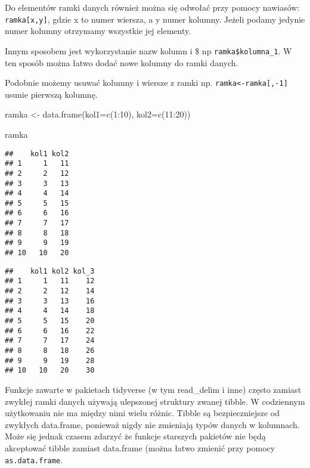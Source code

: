 \documentclass[
]{book}
\newenvironment{Shaded}{\begin{snugshade}}{\end{snugshade}}
\newcommand{\AttributeTok}[1]{\textcolor[rgb]{0.77,0.63,0.00}{#1}}
\newcommand{\DecValTok}[1]{\textcolor[rgb]{0.00,0.00,0.81}{#1}}
\newcommand{\FunctionTok}[1]{\textcolor[rgb]{0.00,0.00,0.00}{#1}}
\newcommand{\NormalTok}[1]{#1}
\newcommand{\OtherTok}[1]{\textcolor[rgb]{0.56,0.35,0.01}{#1}}
\newcommand{\SpecialCharTok}[1]{\textcolor[rgb]{0.00,0.00,0.00}{#1}}
\begin{document}
Do elementów ramki danych również można się odwołać przy pomocy nawiasów: \texttt{ramka{[}x,y{]}}, gdzie x to numer wiersza, a y numer kolumny. Jeżeli podamy jedynie numer kolumny otrzymamy wszystkie jej elementy.

Innym sposobem jest wykorzystanie nazw kolumn i \$ np \texttt{ramka\$kolumna\_1}. W ten sposób można łatwo dodać nowe kolumny do ramki danych.

Podobnie możemy usuwać kolumny i wiersze z ramki np. \texttt{ramka\textless{}-ramka{[},-1{]}} usunie pierwszą kolumnę.

\begin{Shaded}
\begin{Highlighting}[]
\NormalTok{ramka }\OtherTok{\textless{}{-}} \FunctionTok{data.frame}\NormalTok{(}\AttributeTok{kol1=}\FunctionTok{c}\NormalTok{(}\DecValTok{1}\SpecialCharTok{:}\DecValTok{10}\NormalTok{), }\AttributeTok{kol2=}\FunctionTok{c}\NormalTok{(}\DecValTok{11}\SpecialCharTok{:}\DecValTok{20}\NormalTok{))}

\NormalTok{ramka}
\end{Highlighting}
\end{Shaded}

\begin{verbatim}
##    kol1 kol2
## 1     1   11
## 2     2   12
## 3     3   13
## 4     4   14
## 5     5   15
## 6     6   16
## 7     7   17
## 8     8   18
## 9     9   19
## 10   10   20
\end{verbatim}

\begin{Shaded}
\end{Shaded}

\begin{verbatim}
##    kol1 kol2 kol_3
## 1     1   11    12
## 2     2   12    14
## 3     3   13    16
## 4     4   14    18
## 5     5   15    20
## 6     6   16    22
## 7     7   17    24
## 8     8   18    26
## 9     9   19    28
## 10   10   20    30
\end{verbatim}

Funkcje zawarte w pakietach tidyverse (w tym read\_delim i inne) często zamiast zwykłej ramki danych używają ulepszonej struktury zwanej tibble. W codziennym użytkowaniu nie ma między nimi wielu różnic. Tibble są bezpieczniejsze od zwykłych data.frame, ponieważ nigdy nie zmieniają typów danych w kolumnach. Może się jednak czasem zdarzyć że funkcje starszych pakietów nie będą akceptować tibble zamiast data.frame (można łatwo zmienić przy pomocy \texttt{as.data.frame}.
\end{document}
